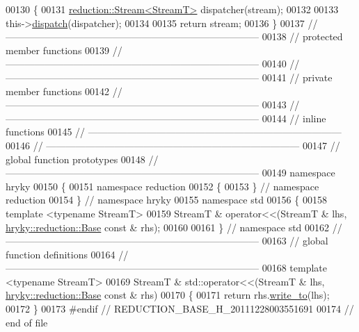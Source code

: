 \begin{DoxyCode}
00130 \textcolor{keyword}{}\{
00131     \hyperlink{classhryky_1_1reduction_1_1_stream}{reduction::Stream<StreamT>} dispatcher(stream);
00132 
00133     this->\hyperlink{classhryky_1_1reduction_1_1_base_a71b31d4d0ed915254e2cb1ef217f28c4}{dispatch}(dispatcher);
00134 
00135     \textcolor{keywordflow}{return} stream;
00136 \}
00137 \textcolor{comment}{//
      ------------------------------------------------------------------------------}
00138 \textcolor{comment}{// protected member functions}
00139 \textcolor{comment}{//
      ------------------------------------------------------------------------------}
00140 \textcolor{comment}{//
      ------------------------------------------------------------------------------}
00141 \textcolor{comment}{// private member functions}
00142 \textcolor{comment}{//
      ------------------------------------------------------------------------------}
00143 \textcolor{comment}{//
      ------------------------------------------------------------------------------}
00144 \textcolor{comment}{// inline functions}
00145 \textcolor{comment}{//
      ------------------------------------------------------------------------------}
00146 \textcolor{comment}{//
      ------------------------------------------------------------------------------}
00147 \textcolor{comment}{// global function prototypes}
00148 \textcolor{comment}{//
      ------------------------------------------------------------------------------}
00149 \textcolor{keyword}{namespace }hryky
00150 \{
00151 \textcolor{keyword}{namespace }reduction
00152 \{
00153 \} \textcolor{comment}{// namespace reduction}
00154 \} \textcolor{comment}{// namespace hryky}
00155 \textcolor{keyword}{namespace }std
00156 \{
00158     \textcolor{keyword}{template} <\textcolor{keyword}{typename} StreamT>
00159     StreamT & operator<<(StreamT & lhs, \hyperlink{classhryky_1_1reduction_1_1_base}{hryky::reduction::Base} \textcolor{keyword}{const} & rhs);
00160 
00161 \} \textcolor{comment}{// namespace std}
00162 \textcolor{comment}{//
      ------------------------------------------------------------------------------}
00163 \textcolor{comment}{// global function definitions}
00164 \textcolor{comment}{//
      ------------------------------------------------------------------------------}
00168 \textcolor{comment}{}\textcolor{keyword}{template} <\textcolor{keyword}{typename} StreamT>
00169 StreamT & std::operator<<(StreamT & lhs, \hyperlink{classhryky_1_1reduction_1_1_base}{hryky::reduction::Base} \textcolor{keyword}{const} & rhs)
00170 \{
00171     \textcolor{keywordflow}{return} rhs.\hyperlink{classhryky_1_1reduction_1_1_base_a709cc7c48e1c90fe253739e46d82aa19}{write_to}(lhs);
00172 \}
00173 \textcolor{preprocessor}{#endif // REDUCTION\_BASE\_H\_20111228003551691}
00174 \textcolor{preprocessor}{}\textcolor{comment}{// end of file}
\end{DoxyCode}
